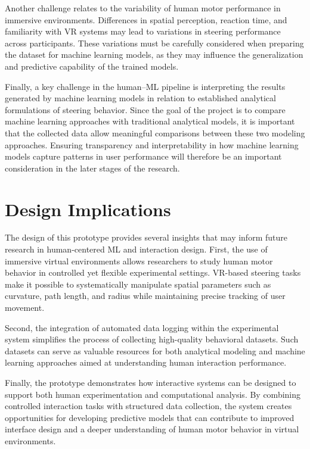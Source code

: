 \documentclass[sigconf]{acmart}
\begin{document}
Another challenge relates to the variability of human motor performance in immersive environments. Differences in spatial perception, reaction time, and familiarity with VR systems may lead to variations in steering performance across participants. These variations must be carefully considered when preparing the dataset for machine learning models, as they may influence the generalization and predictive capability of the trained models.

Finally, a key challenge in the human--ML pipeline is interpreting the results generated by machine learning models in relation to established analytical formulations of steering behavior. Since the goal of the project is to compare machine learning approaches with traditional analytical models, it is important that the collected data allow meaningful comparisons between these two modeling approaches. Ensuring transparency and interpretability in how machine learning models capture patterns in user performance will therefore be an important consideration in the later stages of the research.
\section{Design Implications}

The design of this prototype provides several insights that may inform future research in human-centered ML and interaction design. First, the use of immersive virtual environments allows researchers to study human motor behavior in controlled yet flexible experimental settings. VR-based steering tasks make it possible to systematically manipulate spatial parameters such as curvature, path length, and radius while maintaining precise tracking of user movement.

Second, the integration of automated data logging within the experimental system simplifies the process of collecting high-quality behavioral datasets. Such datasets can serve as valuable resources for both analytical modeling and machine learning approaches aimed at understanding human interaction performance.

Finally, the prototype demonstrates how interactive systems can be designed to support both human experimentation and computational analysis. By combining controlled interaction tasks with structured data collection, the system creates opportunities for developing predictive models that can contribute to improved interface design and a deeper understanding of human motor behavior in virtual environments.
\end{document}
